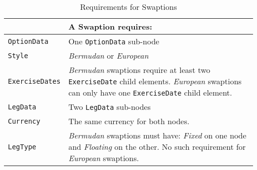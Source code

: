 \begin{table}[H]
\centering
\begin{tabu} to 0.9\linewidth {| X[-1.5,l,m] | X[-5,l,m] |}
    \hline
        & \bfseries{A  Swaption requires:} \\  \hline
    \lstinline!OptionData! & One \lstinline!OptionData! sub-node  \\  \hline
   \lstinline!Style! &  \emph{Bermudan} or \emph{European}\\ \hline
    \lstinline!ExerciseDates! & \emph{Bermudan} swaptions  require at least two \lstinline!ExerciseDate! child elements.  \emph{European} swaptions can only have one \lstinline!ExerciseDate! child element. \\ \hline
    \lstinline!LegData! &  Two \lstinline!LegData! sub-nodes \\ \hline 
    \lstinline!Currency! & The same currency for both nodes.\\ \hline 
    \lstinline!LegType! & \emph{Bermudan} swaptions must have: \emph{Fixed} on one node and \emph{Floating} on the other.  No such requirement for \emph{European} swaptions.     \\ \hline   
  \end{tabu}
  \caption{Requirements for Swaptions}
  \label{tab:swaption_requirements}
\end{table}
